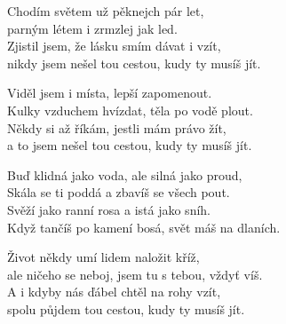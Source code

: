 
\ve{}
Chodím světem už pěknejch pár let,\\
parným létem i zrmzlej jak led.\\
Zjistil jsem, že lásku smím dávat i vzít,\\
nikdy jsem nešel tou cestou, kudy ty musíš jít.

\ve{}
Viděl jsem i místa, lepší zapomenout.\\
Kulky vzduchem hvízdat, těla po vodě plout.\\
Někdy si až říkám, jestli mám právo žít,\\
a to jsem nešel tou cestou, kudy ty musíš jít.

\cho{}
Buď klidná jako voda, ale silná jako proud,\\
Skála se ti poddá a zbavíš se všech pout.\\
Svěží jako ranní rosa a istá jako sníh.\\
Když tančíš po kamení bosá, svět máš na dlaních.

\ve{}
Život někdy umí lidem naložit kříž,\\
ale ničeho se neboj, jsem tu s tebou, vždyť víš.\\
A i kdyby nás ďábel chtěl na rohy vzít,\\
spolu půjdem tou cestou, kudy ty musíš jít.

\cho{}

\cho{}

\esong{}